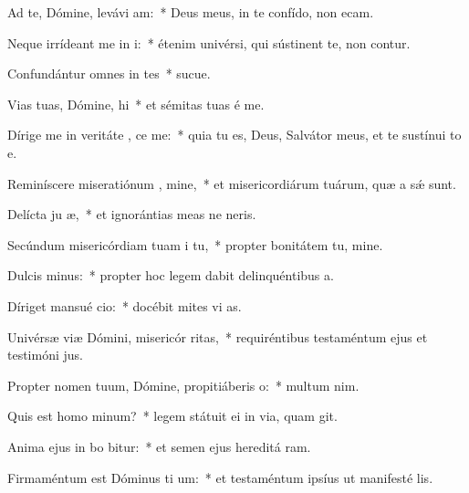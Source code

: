 \item Ad te, Dómine, levávi  am:~* Deus meus, in te confído, non ecam.
\item Neque irrídeant me in i:~* étenim univérsi, qui sústinent te, non contur.
\item Confundántur omnes in tes~* sucue.
\item Vias tuas, Dómine,  hi~* et sémitas tuas é me.
\item Dírige me in veritáte ,  ce me:~* quia tu es, Deus, Salvátor meus, et te sustínui to e.
\item Reminíscere miseratiónum , mine,~* et misericordiárum tuárum, quæ a sǽ sunt.
\item Delícta ju æ,~* et ignorántias meas ne neris.
\item Secúndum misericórdiam tuam  i tu,~* propter bonitátem tu, mine.
\item Dulcis   minus:~* propter hoc legem dabit delinquéntibus  a.
\item Díriget mansué  cio:~* docébit mites vi as.
\item Univérsæ viæ Dómini, misericór  ritas,~* requiréntibus testaméntum ejus et testimóni jus.
\item Propter nomen tuum, Dómine, propitiáberis  o:~* multum  nim.
\item Quis est homo   minum?~* legem státuit ei in via, quam git.
\item Anima ejus in bo bitur:~* et semen ejus hereditá ram.
\item Firmaméntum est Dóminus ti um:~* et testaméntum ipsíus ut manifesté lis.
